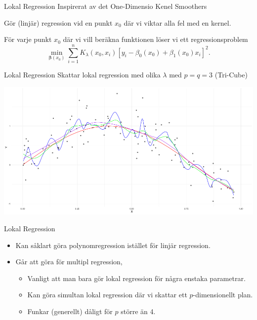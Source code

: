 \documentclass[10pt,english]{beamer}
\begin{document}
\begin{frame}{Lokal Regression}
    Inspirerat av det One-Dimensio Kenel Smoothers
    \begin{greenbox}
        Gör (linjär) regression vid en punkt $x_0$ där vi viktar alla fel med en kernel.
    \end{greenbox}

    För varje punkt $x_0$ där vi vill beräkna funktionen löser vi ett regressionsproblem
    \begin{equation*}
        \min_{\mathbf{\beta}(x_0)} \sum_{i=1}^{n} K_{\lambda}(x_0, x_i) [y_i - \beta_0(x_0) + \beta_1(x_0) x_i]^2.
    \end{equation*}

\end{frame}

\begin{frame}{Lokal Regression}
    Skattar lokal regression med olika $\lambda$ med $p = q = 3$ (Tri-Cube)

    \includegraphics[width = \textwidth]{fig/locreg.png}
\end{frame}

\begin{frame}{Lokal Regression}
    
    \begin{itemize}
        \item Kan såklart göra polynomregression istället för linjär regression.
        \item Går att göra för multipl regression,
        \begin{itemize}
            \item Vanligt att man bara gör lokal regression för några enstaka parametrar.
            \item Kan göra simultan lokal regression där vi skattar ett $p$-dimensionellt plan.
            \item Funkar (generellt) dåligt för $p$ större än 4.
        \end{itemize}
    \end{itemize}

\end{frame}
\end{document}
